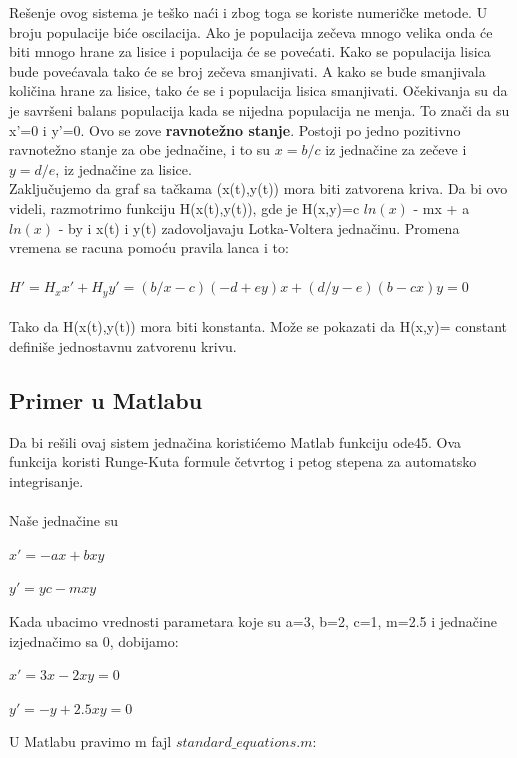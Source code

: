 \documentclass[a4paper]{article}
\begin{document}
Rešenje ovog sistema je teško naći i zbog toga se koriste numeričke metode. U broju populacije biće oscilacija.
Ako je populacija zečeva mnogo velika onda će biti mnogo hrane za lisice i populacija će se povećati.
Kako se populacija lisica bude povećavala tako će se broj zečeva smanjivati. A kako se bude smanjivala
količina hrane za lisice, tako će se i populacija lisica smanjivati. Očekivanja su da je savršeni balans populacija
kada se nijedna populacija ne menja. To znači da su  x'=0 i y'=0. Ovo se zove  \textbf{ravnotežno stanje}.
Postoji po jedno pozitivno ravnotežno stanje za obe jednačine, i to su $x=b/c$ iz jednačine za zečeve i $y=d/e$, iz jednačine za lisice.\\ 
Zaključujemo da  graf sa tačkama (x(t),y(t)) mora biti zatvorena kriva.
Da bi ovo videli, razmotrimo funkciju H(x(t),y(t)), gde
je H(x,y)=c $ln(x)$ - mx + a $ln(x)$ - by i x(t) i y(t) zadovoljavaju Lotka-Voltera jednačinu.
Promena vremena se racuna pomoću pravila lanca i to: \\ \\ $H'=H_x x' + H_y y' = (b/x - c)(-d + ey)x + (d/y - e)(b - cx)y = 0$ \\ \\
Tako da  H(x(t),y(t)) mora biti konstanta. Može se pokazati da H(x,y)= constant definiše jednostavnu zatvorenu krivu.

\subsection{Primer u Matlabu}
\label{sub:std_primer}
Da bi rešili ovaj sistem jednačina koristićemo Matlab funkciju ode45. Ova funkcija koristi Runge-Kuta
formule četvrtog i petog stepena za automatsko integrisanje.\\ \\
 Naše jednačine su 
	\begin{center}
		$x' = -ax + bxy$
	\end{center}
	\begin{center}
		$y' =yc - mxy$
	\end{center}
Kada ubacimo vrednosti parametara koje su a=3, b=2, c=1, m=2.5 i jednačine izjednačimo sa 0, dobijamo:
	\begin{center}
		$x'=3x - 2xy = 0$
	\end{center}
	\begin{center}
		$y'=-y + 2.5xy = 0$
	\end{center}
U Matlabu pravimo m fajl $ standard\_equations.m $:


\end{document}
